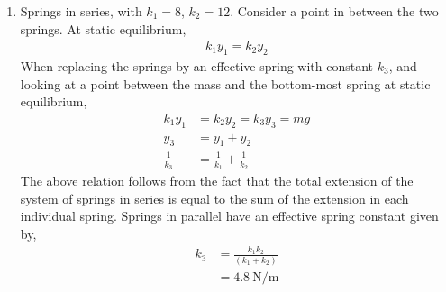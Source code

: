 \begin{enumerate}
    \item Springs in series, with $ k_{1} = 8 $, $ k_{2} = 12$. Consider a point in
          between the two springs. At static equilibrium,
          \begin{align}
              k_{1}y_{1} = k_{2}y_{2}
          \end{align}
          When replacing the springs by an effective spring with constant $ k_{3} $,
          and looking at a point between the mass and the bottom-most spring at
          static equilibrium,
          \begin{align}
              k_{1}y_{1}      & = k_{2}y_{2} = k_{3}y_{3} = mg      \\
              y_{3}           & = y_{1} + y_{2}                     \\
              \frac{1}{k_{3}} & = \frac{1}{k_{1}} + \frac{1}{k_{2}}
          \end{align}
          The above relation follows from the fact that the total extension of the
          system of springs in series is equal to the sum of the extension in each
          individual spring.
          Springs in parallel have an effective spring constant given by,
          \begin{align}
              k_{3} & = \frac{k_{1}k_{2}}{(k_{1} + k_{2})} \\
                    & = \SI{4.8}{\N\per\m}
          \end{align}


\end{enumerate}
